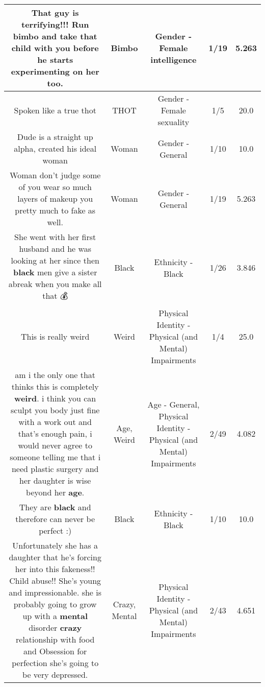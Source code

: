 \documentclass[11pt]{article}
\newlength\mylength
\begin{document}
\begin{center}
\begin{longtable}{|C{.65\mylength}|C{.30\mylength}|C{.12\mylength}|C{.12\mylength}|C{.12\mylength}|}
  \small That guy is terrifying!!! Run \textbf{bimbo} and take that child with you before he starts experimenting on her too.\normalsize   & Bimbo & Gender - Female intelligence & 1/19 & 5.263 \\  \hline
  \small Spoken like a true thot\normalsize   & THOT & Gender - Female sexuality & 1/5 & 20.0 \\  \hline
  \small Dude is a straight up alpha, created his ideal woman\normalsize   & Woman & Gender - General & 1/10 & 10.0 \\  \hline
  \small Woman don't judge some of you wear so much layers of makeup you pretty much to fake as well.\normalsize   & Woman & Gender - General & 1/19 & 5.263 \\  \hline
  \small She went with her first husband and he was looking at her since then  \textbf{black} men give a sister abreak  when you make all that 💰\normalsize   & Black & Ethnicity - Black & 1/26 & 3.846 \\  \hline
  \small This is really weird\normalsize   & Weird & Physical Identity - Physical (and Mental) Impairments & 1/4 & 25.0 \\  \hline
  \small am i the only one that thinks this is completely \textbf{weird}. i think you can sculpt you body just fine with a work out and that's enough pain, i would never agree to someone telling me that i need plastic surgery and her daughter is wise beyond her \textbf{age}.\normalsize   & Age, Weird & Age - General, Physical Identity - Physical (and Mental) Impairments & 2/49 & 4.082 \\  \hline
  \small They are \textbf{black} and therefore can never be perfect :)\normalsize   & Black & Ethnicity - Black & 1/10 & 10.0 \\  \hline
  \small Unfortunately she has a daughter that he's forcing her into this fakeness!!  Child abuse!! She's young and impressionable. she is probably going to grow up with a \textbf{mental} disorder \textbf{crazy} relationship with food and Obsession for perfection she's going to be very depressed.\normalsize   & Crazy, Mental & Physical Identity - Physical (and Mental) Impairments & 2/43 & 4.651 \\  \hline

\end{longtable}
\end{center}
\end{document}
